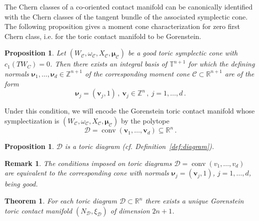 \documentclass[a4paper,11pt,reqno]{amsart}
\newcommand{\R}{\mathbb R}
\newcommand{\Z}{\mathbb Z}
\newcommand{\T}{\mathbb T}
\newcommand{\Cc}{{\mathcal C}}
\newcommand{\Dd}{{\mathcal D}}
\newcommand{\om}{\omega}
\DeclareMathOperator{\conv}{conv}
\newtheorem{thm}[theorem]{Theorem}
\newtheorem{proposition}[theorem]{Proposition}
\newtheorem{prop}[theorem]{Proposition}
\newtheorem{rem}[theorem]{Remark}
\begin{document}
The Chern classes of a co-oriented contact manifold can be canonically identified with the 
Chern classes of the tangent bundle of the associated symplectic cone. The following proposition 
gives a moment cone characterization for zero first Chern class, i.e. for the toric contact manifold 
to be Gorenstein.
\begin{prop} \label{prop:c_1}
Let $(W_{\Cc}, \om_{\Cc}, X_{\Cc}, \bm{\mu}_{\Cc})$ be a good toric symplectic cone with $c_1 (TW_C) = 0$. 
Then there exists an integral basis of $\T^{n+1}$ for which the defining normals $\bm{\nu}_1,\ldots,\bm{\nu}_d \in \Z^{n+1}$ 
of the corresponding moment cone $\Cc\subset\R^{n+1}$ are of the form
\[
\bm{\nu}_j = (\bm{v}_j, 1)\,,\ \bm{v}_j \in \Z^n\,,\ j=1,\ldots,d\,.
\]
\end{prop}
\noindent Under this condition, we will encode the Gorenstein toric contact manifold  whose symplectization is 
$(W_{\Cc}, \om_{\Cc}, X_{\Cc}, \bm{\mu}_{\Cc})$ by the polytope 
\[
\Dd = \conv(\bm{v}_1, \ldots, \bm{v}_d)\subseteq \R^n\,.
\]
\begin{proposition} \label{prop:diagram}
$\Dd$ is a toric diagram (cf. Definition~\ref{def:diagram}).
\end{proposition}
\begin{rem} \label{rem:diagram}
The conditions imposed on toric diagrams $\Dd=\conv(v_1, \ldots, v_d)$ are equivalent to the corresponding cone 
with normals $\bm{\nu}_j=(\bm{v}_j, 1)$, $j=1,\ldots,d$, being good.
\end{rem}
\begin{thm} \label{thm:diagram}
For each toric diagram $\Dd\subset\R^n$ there exists a unique Gorenstein toric contact manifold $(N_{\Dd}, \xi_{\Dd})$ of 
dimension $2n+1$.
\end{thm}
\end{document}
